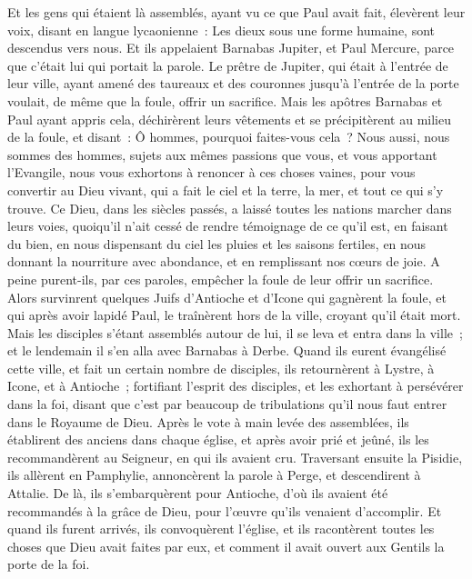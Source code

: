 \begin{multicols}{2}
Et les gens qui étaient là assemblés, ayant vu ce que Paul avait fait, élevèrent leur voix, disant en langue lycaonienne~: Les dieux sous une forme humaine, sont descendus vers nous.
Et ils appelaient Barnabas Jupiter, et Paul Mercure, parce que c'était lui qui portait la parole.
Le prêtre de Jupiter, qui était à l'entrée de leur ville, ayant amené des taureaux et des couronnes jusqu'à l'entrée de la porte voulait, de même que la foule, offrir un sacrifice.
Mais les apôtres Barnabas et Paul ayant appris cela, déchirèrent leurs vêtements et se précipitèrent au milieu de la foule,
et disant~: Ô hommes, pourquoi faites-vous cela~? Nous aussi, nous sommes des hommes, sujets aux mêmes passions que vous, et vous apportant l'Evangile, nous vous exhortons à renoncer à ces choses vaines, pour vous convertir au Dieu vivant, qui a fait le ciel et la terre, la mer, et tout ce qui s'y trouve.
Ce Dieu, dans les siècles passés, a laissé toutes les nations marcher dans leurs voies,
quoiqu'il n'ait cessé de rendre témoignage de ce qu'il est, en faisant du bien, en nous dispensant du ciel les pluies et les saisons fertiles, en nous donnant la nourriture avec abondance, et en remplissant nos cœurs de joie.
A peine purent-ils, par ces paroles, empêcher la foule de leur offrir un sacrifice.
Alors survinrent quelques Juifs d'Antioche et d'Icone qui gagnèrent la foule, et qui après avoir lapidé Paul, le traînèrent hors de la ville, croyant qu'il était mort.
Mais les disciples s'étant assemblés autour de lui, il se leva et entra dans la ville~; et le lendemain il s'en alla avec Barnabas à Derbe.
Quand ils eurent évangélisé cette ville, et fait un certain nombre de disciples, ils retournèrent à Lystre, à Icone, et à Antioche~;
fortifiant l'esprit des disciples, et les exhortant à persévérer dans la foi, disant que c'est par beaucoup de tribulations qu'il nous faut entrer dans le Royaume de Dieu.
Après le vote à main levée des assemblées, ils établirent des anciens dans chaque église, et après avoir prié et jeûné, ils les recommandèrent au Seigneur, en qui ils avaient cru.
Traversant ensuite la Pisidie, ils allèrent en Pamphylie,
annoncèrent la parole à Perge, et descendirent à Attalie.
De là, ils s'embarquèrent pour Antioche, d'où ils avaient été recommandés à la grâce de Dieu, pour l'œuvre qu'ils venaient d'accomplir.
Et quand ils furent arrivés, ils convoquèrent l'église, et ils racontèrent toutes les choses que Dieu avait faites par eux, et comment il avait ouvert aux Gentils la porte de la foi.

\end{multicols}
